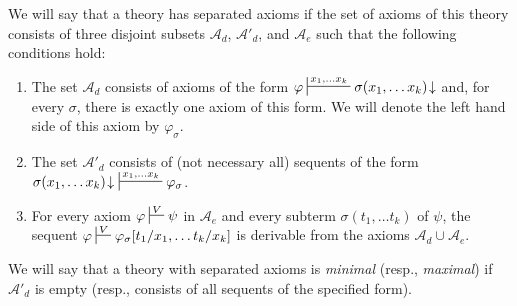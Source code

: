 \documentclass[reqno]{amsart}
\theoremstyle{definition}
\theoremstyle{remark}
\numberwithin{figure}{section}
\begin{document}
We will say that a theory has separated axioms if the set of axioms of this theory consists of three disjoint subsets $\mathcal{A}_d$, $\mathcal{A}'_d$, and $\mathcal{A}_e$ such that the following conditions hold:
\begin{enumerate}
\item The set $\mathcal{A}_d$ consists of axioms of the form $\varphi \sststile{}{x_1, \ldots x_k} \sigma(x_1, \ldots x_k)\!\downarrow$ and, for every $\sigma$, there is exactly one axiom of this form.
We will denote the left hand side of this axiom by $\varphi_\sigma$.
\item The set $\mathcal{A}'_d$ consists of (not necessary all) sequents of the form $\sigma(x_1, \ldots x_k)\!\downarrow\ \sststile{}{x_1, \ldots x_k} \varphi_\sigma$.
\item \label{it:sep-ax} For every axiom $\varphi \sststile{}{V} \psi$ in $\mathcal{A}_e$ and every subterm $\sigma(t_1, \ldots t_k)$ of $\psi$,
the sequent $\varphi \sststile{}{V} \varphi_\sigma[t_1/x_1, \ldots t_k/x_k]$ is derivable from the axioms $\mathcal{A}_d \cup \mathcal{A}_e$.
\end{enumerate}
We will say that a theory with separated axioms is \emph{minimal} (resp., \emph{maximal}) if $\mathcal{A}'_d$ is empty (resp., consists of all sequents of the specified form).
\end{document}
